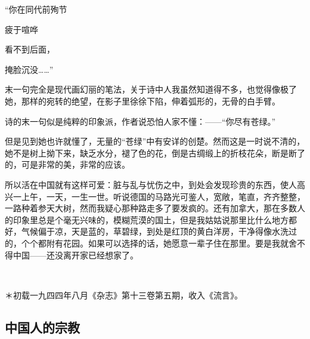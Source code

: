 \par “你在同代前殉节
\par 疲于喧哗
\par 看不到后面，
\par 掩脸沉没……”
\par 末一句完全是现代画幻丽的笔法，关于诗中人我虽然知道得不多，也觉得像极了她，那样的宛转的绝望，在影子里徐徐下陷，伸着弧形的，无骨的白手臂。
\par 诗的末一句似是纯粹的印象派，作者说恐怕人家不懂：——“你尽有苍绿。”
\par 但是见到她也许就懂了，无量的“苍绿”中有安详的创楚。然而这是一时说不清的，她不是树上拗下来，缺乏水分，褪了色的花，倒是古绸缎上的折枝花朵，断是断了的，可是非常的美，非常的应该。
\par 所以活在中国就有这样可爱：脏与乱与忧伤之中，到处会发现珍贵的东西，使人高兴一上午，一天，一生一世。听说德国的马路光可鉴人，宽敞，笔直，齐齐整整，一路种着参天大树，然而我疑心那种路走多了要发疯的。还有加拿大，那在多数人的印象里总是个毫无兴味的，模糊荒漠的国土，但是我姑姑说那里比什么地方都好，气候偏于凉，天是蓝的，草碧绿，到处是红顶的黄白洋房，干净得像水洗过的，个个都附有花园。如果可以选择的话，她愿意一辈子住在那里。要是我就舍不得中国——还没离开家已经想家了。
\par  
\par ＊初载一九四四年八月《杂志》第十三卷第五期，收入《流言》。


\subsection{中国人的宗教}

